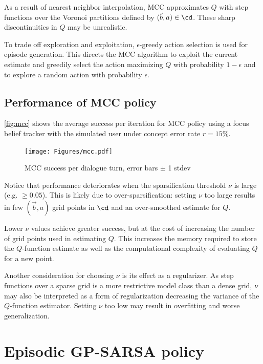 \documentclass[a4paper,oneside,reqno]{amsart}
\begin{document}
As a result of nearest neighbor interpolation, MCC approximates $Q$ with
step functions over the Voronoi partitions defined by $(\vec{b},a) \in \cd$.
These sharp discontinuities in $Q$ may be unrealistic.

To trade off exploration and exploitation, $\epsilon$-greedy action
selection is used for episode generation. This directs the MCC algorithm
to exploit the current estimate and greedily select the action maximizing $Q$
with probability $1 - \epsilon$ and to explore a random action with probability
$\epsilon$.

\subsection{Performance of MCC policy}

\autoref{fig:mcc} shows the average success per iteration for MCC policy using
a focus belief tracker with the simulated user under concept error rate
$r=15\%$.

\begin{figure}[ht!]
  \begin{center}
    \texttt{[image: Figures/mcc.pdf]}
  \end{center}
  \caption{MCC success per dialogue turn, error bars $\pm$ 1 stdev}
  \label{fig:mcc}
\end{figure}

Notice that performance deteriorates when the sparsification threshold $\nu$ is
large (e.g. $\geq 0.05$). This is likely due to over-sparsification: setting
$\nu$ too large results in few $(\vec{b},a)$ grid points in $\cd$ and an
over-smoothed estimate for $Q$.

Lower $\nu$ values achieve greater success, but at the cost of increasing the
number of grid points used in estimating $Q$. This increases the memory
required to store the $Q$-function estimate as well as the computational
complexity of evaluating $Q$ for a new point.

Another consideration for choosing $\nu$ is its effect as a regularizer.  As
step functions over a sparse grid is a more restrictive model class than a
dense grid, $\nu$ may also be interpreted as a form of regularization
decreasing the variance of the $Q$-function estimator. Setting $\nu$ too low
may result in overfitting and worse generalization.

\section{Episodic GP-SARSA policy}\label{sec:gp}
\end{document}
